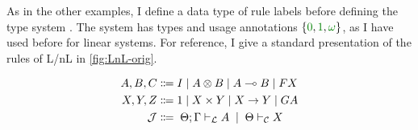 
As in the other examples, I define a data type of rule labels
 before defining the type system .
The system  has types  and usage
annotations $\{\gr0, \gr1, \gr\omega\}$, as I have used before for linear
systems.
For reference, I give a standard presentation of the rules of L/nL in
\cref{fig:LnL-orig}.

\begin{figure}
  \begin{align*}
    A, B, C &\Coloneqq I \mid A \otimes B \mid A \multimap B \mid FX \\
    X, Y, Z &\Coloneqq 1 \mid X \times Y \mid X \to Y \mid GA \\
    \mathcal J &\Coloneqq \; \Theta; \Gamma \mathrel{\vdash_{\mathcal L}} A \; \mid \; \Theta \mathrel{\vdash_{\mathcal C}} X
  \end{align*}
\end{figure}

